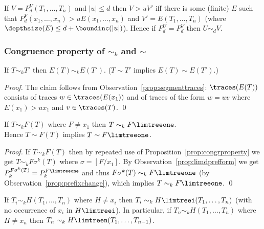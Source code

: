 \documentclass[12pt]{article}
\begin{document}
\begin{observ}\label{prop:prefixchange}
If $V=P^V_d(T_1,\dots,T_n)$ and   $|u|\leq d$ then
$V\gt{u}V'$
iff there is some (finite) $E$  such that 
$P^V_d(x_1,\dots,x_n)\gt{u}E(x_1,\dots,x_n)$ 
and
$V'=E(T_1,\dots,T_n)$ (where $\depthsize(E)\leq d+\boundinc(|u|)$). 
Hence if $P^{U}_d=P^V_d$ then  $U\sim_d V$.
\end{observ}


\subsubsection*{Congruence property of $\sim_k$ and $\sim$}


\begin{prop}\label{prop:congrproperty}
If $T\sim_k T'$ then $E(T)\sim_k E(T')$. 
($T\sim T'$ implies $E(T)\sim E(T')$.)
\end{prop}

\begin{proof}
The claim follows from Observation~\ref{prop:segmenttraces}:
$\traces(E(T))$ consists of traces $w\in\traces(E(x_1))$ 
and of traces of the form
$w=uv$ where $E(x_1)\gt{u}x_1$ and $v\in\traces(T)$.
\qed
\end{proof}

\noindent


\begin{prop}\label{prop:congrlim}
If $T\sim_k F(T)$ where $F\neq x_1$ then 
$T\sim_k F\limtreeone$.
\\
Hence $T\sim F(T)$ implies $T\sim F\limtreeone$.
\end{prop}

\begin{proof}
If $T\sim_k F(T)$
then by repeated use of Proposition~\ref{prop:congrproperty} we get
$T\sim_k F\sigma^k(T)$ where $\sigma=[F/x_1]$. 
By Observation~\ref{prop:limdprefform} we get
$P^{F\sigma^k(T)}_k=P^{F\limtreeone}_k$ and
thus $F\sigma^k(T)\sim_k F\limtreeone$
(by Observation~\ref{prop:prefixchange}), which implies
$T\sim_k F\limtreeone$.
\qed
\end{proof}

\begin{cor}\label{prop:corcongrlimequat}
If $T_i\sim_k H(T_1,\dots,T_n)$ where $H\neq x_i$ then
$T_i\sim_k H\limtreei(T_1,\dots,T_n)$ (with no occurrence of $x_i$ in 
$H\limtreei$). In particular, 
if $T_n\sim_k H(T_1,\dots,T_n)$ where  $H\neq x_n$ then  
$T_n\sim_k H\limtreen(T_1,\dots,T_{n-1})$.
\end{cor}
\end{document}
